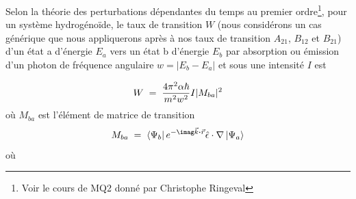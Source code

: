 Selon la théorie des perturbations dépendantes du temps au premier ordre\footnote{Voir le cours de MQ2 donné par Christophe Ringeval}, pour un système hydrogénoïde, le taux de transition $W$ (nous considérons un cas générique que nous appliquerons après à nos taux de transition $A_{21}$, $B_{12}$ et $B_{21}$) d'un état a d'énergie $E_a$ vers un état b d'énergie $E_b$ par absorption ou émission d'un photon de fréquence angulaire $w=|E_b-E_a|$ et sous une intensité $I$ est

\begin{equation}
    W\; = \; \dfrac{4\pi^2 \alpha \hbar}{m^2 w^2}I|M_{ba}|^2
\end{equation}
où $M_{ba}$ est l'élément de matrice de transition
\begin{equation}
    M_{ba}\eq \bra{\Psi_b}e^{-\imag\vec{k}\Cdot \vec{r}}\hat{\epsilon}\cdot\nabla \ket{\Psi_a}
    \label{Mba}
\end{equation}
où

